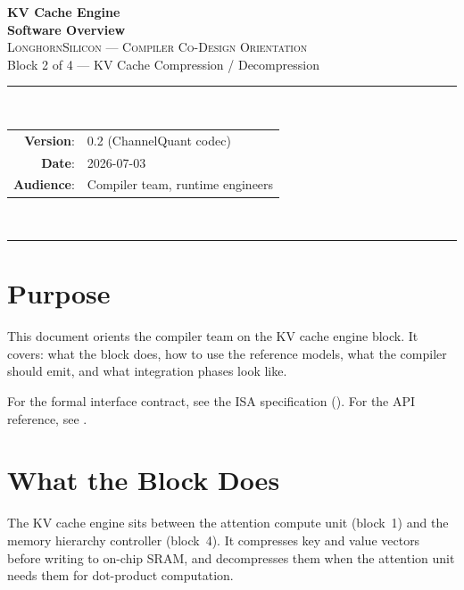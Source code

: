 \documentclass[11pt]{article}
\begin{document}
\thispagestyle{empty}
\begin{center}
\vspace*{1.2in}
{\Huge\bfseries KV Cache Engine}\\[0.4em]
{\LARGE\bfseries Software Overview}\\[1.2em]

{\large \textsc{LonghornSilicon --- Compiler Co-Design Orientation}}\\[0.4em]
{\large Block 2 of 4 --- KV Cache Compression / Decompression}\\[2em]

\rule{0.7\textwidth}{0.4pt}\\[1em]

\begin{tabular}{rl}
\textbf{Version}:    & 0.2 (ChannelQuant codec) \\
\textbf{Date}:       & 2026-07-03 \\
\textbf{Audience}:   & Compiler team, runtime engineers \\
\end{tabular}\\[1em]
\rule{0.7\textwidth}{0.4pt}
\vfill
\end{center}
\clearpage

\tableofcontents
\clearpage

\section{Purpose}

This document orients the compiler team on the KV cache engine block.
It covers: what the block does, how to use the reference models, what
the compiler should emit, and what integration phases look like.

For the formal interface contract, see the ISA specification
(). For the API reference, see
.

\section{What the Block Does}

The KV cache engine sits between the attention compute unit (block~1)
and the memory hierarchy controller (block~4). It compresses key and
value vectors before writing to on-chip SRAM, and decompresses them
when the attention unit needs them for dot-product computation.
\end{document}
